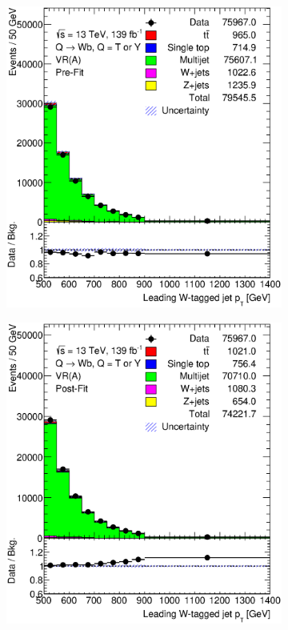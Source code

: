 \begin{figure}[hbt!]
	\centering
	\graphicspath{{figs/appendix/scaledmultijet/ABljetpt/}}
	\begin{subfigure}{.35\textwidth}
		\centering
		\includegraphics[width=\linewidth,height=\textheight,keepaspectratio]{VR_A_ljet_pt.eps}
		\caption{}
	\end{subfigure}\hspace{0.6cm}
	\begin{subfigure}{.35\textwidth}
		\centering
		\includegraphics[width=\linewidth,height=\textheight,keepaspectratio]{VR_A_ljet_pt_postFit.eps}

\end{subfigure}
\end{figure}
